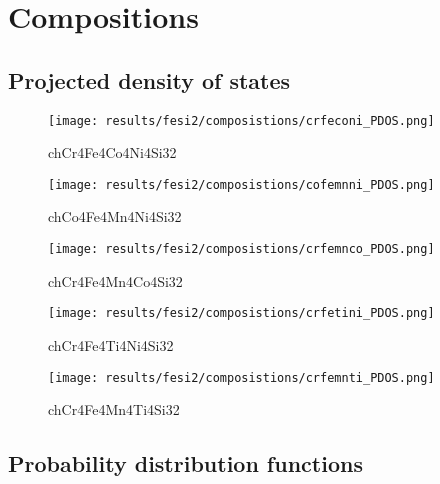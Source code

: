 \chapter{Compositions}
\label{appendix:dos}

\section{Projected density of states}

\begin{figure}[H]
	\texttt{[image: results/fesi2/composistions/crfeconi\_PDOS.png]}
	\caption{ch{Cr4Fe4Co4Ni4Si32}}
\end{figure}

\begin{figure}[H]
	\texttt{[image: results/fesi2/composistions/cofemnni\_PDOS.png]}
	\caption{ch{Co4Fe4Mn4Ni4Si32}}
\end{figure}

\begin{figure}[H]
	\texttt{[image: results/fesi2/composistions/crfemnco\_PDOS.png]}
	\caption{ch{Cr4Fe4Mn4Co4Si32}}

\end{figure}

\begin{figure}[H]
	\texttt{[image: results/fesi2/composistions/crfetini\_PDOS.png]}
	\caption{ch{Cr4Fe4Ti4Ni4Si32}}

\end{figure}

\begin{figure}[H]
	\texttt{[image: results/fesi2/composistions/crfemnti\_PDOS.png]}
	\caption{ch{Cr4Fe4Mn4Ti4Si32}}
\end{figure}

\section{Probability distribution functions}

